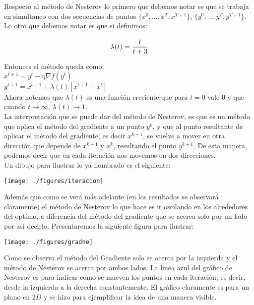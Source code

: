 \documentclass[11pt]{article}
\begin{document}
Respecto al método de Nesterov lo primero que debemos notar es que se trabaja en simultaneo con dos secuencias de puntos $ \lbrace x^0,...,x^{T},x^{T+1} \rbrace $, $ \lbrace y^0,...,y^{T},y^{T+1} \rbrace $. Lo otro que debemos notar es que si definimos:

\[ \lambda(t) = \cfrac{t}{t+3} \]

Entonces el método queda como: \\

$ x^{t+1} = y^{t} - \eta \nabla f(y^{t}) $ \\

$ y^{t+1} = x^{t+1} + \lambda(t) [x^{t+1}-x^{t}] $ \\

Ahora notemos que $ \lambda(t) $ es una función creciente que para $t=0$ vale $0$ y que cuando $ t \rightarrow \infty $, $ \lambda(t) \rightarrow 1 $. \\

La interpretación que se puede dar del método de Nesterov, es que es un método que aplica el método del gradiente a un punto $y^{k}$, y que al punto resultante de aplicar el método del gradiente, es decir $x^{k+1}$, se vuelve a mover en otra dirección que depende de $x^{k+1}$ y $x^{k}$, resultando el punto $y^{k+1}$. De esta manera, podemos decir que en cada iteración nos movemos en dos direcciones. \\

Un dibujo para ilustrar lo ya nombrado es el siguiente: \\

\begin{center}
\texttt{[image: ./figures/iteracion]}
\end{center}

Además que como se verá más adelante (en los resultados se observará claramente) el método de Nesterov lo que hace es ir oscilando en los alrededores del optimo, a diferencia del método del gradiente que se acerca solo por un lado por así decirlo. Presentaremos la siguiente figura para ilustrar: 

\begin{center}
\texttt{[image: ./figures/gradne]}
\end{center}

Como se observa el método del Gradiente solo se acerca por la izquierda y el método de Nesterov se acerca por ambos lados. La linea azul del gráfico de Nesterov es para indicar como se mueven los puntos en cada iteración, es decir, desde la izquierda a la derecha constantemente. El gráfico claramente es para un plano en $2D$ y se hizo para ejemplificar la idea de una manera visible. \\ 
\end{document}
